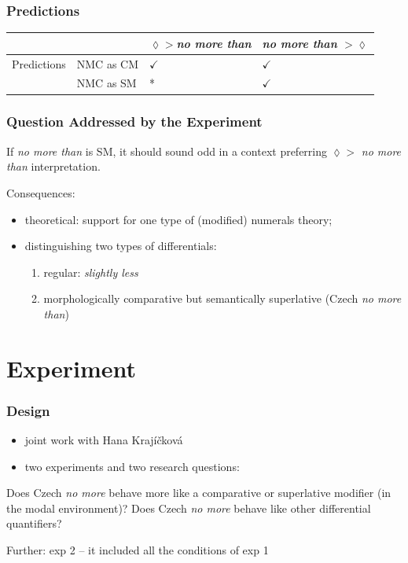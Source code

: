 \documentclass[10pt
]{beamer}
\begin{document}
\begin{frame}
  \frametitle{Predictions}

  \begin{longtable}[]{@{}llll@{}}
    \toprule
    & & $\lozenge >$\textit{no more than} & \textit{no more than} $> \lozenge$ \\
    \midrule
    \endhead
    Predictions & NMC as CM & \(\checkmark\) & \(\checkmark\) \\
    & NMC as SM & * & \(\checkmark\) \\
    \bottomrule
    \end{longtable}
  

\end{frame}

\begin{frame}
  \frametitle{Question Addressed by the Experiment}

  \ex If \textit{no more than} is SM, it should sound odd in a context preferring $\lozenge > $ \textit{no more than} interpretation.
  \xe
  
Consequences:

\begin{itemize}
  \item theoretical: support for one type of (modified) numerals theory;
  \item distinguishing two types of differentials:
    \begin{enumerate}
      \item regular: \textit{slightly less}
      \item morphologically comparative but semantically superlative (Czech \textit{no more than})
    \end{enumerate}  
\end{itemize}

\end{frame}

\section{Experiment}

\begin{frame}
  \frametitle{Design}

\begin{itemize}
  \item joint work with Hana Krajíčková
  \item two experiments and two research questions:  
\end{itemize}
  
\pex \a Does Czech \textit{no more} behave more like a comparative or superlative modifier (in the modal environment)? 
\a Does Czech \textit{no more} behave like other differential quantifiers?
\xe

Further: exp 2 -- it included all the conditions of exp 1

\end{frame}
\end{document}

